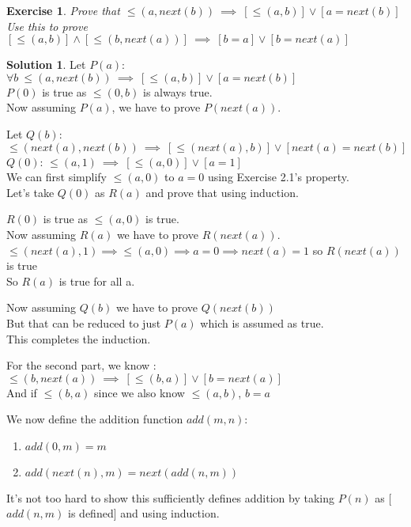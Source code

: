 \documentclass[a4paper,10pt]{article}
\newtheorem{exercise}{Exercise}[section]
\theoremstyle{definition} %
\newtheorem*{solution}{Solution}
\begin{document}
    \begin{exercise}
        Prove that $\leq(a, next(b)) \ \implies \ [\leq(a,b)] \lor [a=next(b)]$ \\
        Use this to prove $[\leq(a,b)] \land [\leq(b,next(a))] \ \implies \ [b=a] \lor [b=next(a)]$
    \end{exercise}
    \begin{solution}
        Let $P(a)$: $\forall b \ \leq(a, next(b)) \ \implies \ [\leq(a,b)] \lor [a=next(b)]$ \\
        $P(0)$ is true as $\leq(0,b)$ is always true. \\
        Now assuming $P(a)$, we have to prove $P(next(a))$.
        \begin{adjustwidth}{1cm}{0cm}
            Let $Q(b)$: $\leq(next(a), next(b)) \ \implies \ [\leq(next(a),b)] \lor [next(a)=next(b)]$ \\
            $Q(0)$: $\leq(a, 1) \ \implies \ [\leq(a,0)] \lor [a=1]$ \\
            We can first simplify $\leq(a,0)$ to $a=0$ using Exercise 2.1's property. \\
            Let's take $Q(0)$ as $R(a)$ and prove that using induction.
            \newpage
            \begin{adjustwidth}{1cm}{0cm}
                $R(0)$ is true as $\leq(a,0)$ is true. \\
                Now assuming $R(a)$ we have to prove $R(next(a))$. \\
                $\leq(next(a),1) \implies \leq(a,0) \implies a=0 \implies next(a)=1$ so $R(next(a))$ is true \\
                So $R(a)$ is true for all a.
            \end{adjustwidth}
            Now assuming $Q(b)$ we have to prove $Q(next(b))$ \\
            But that can be reduced to just $P(a)$ which is assumed as true. \\
            This completes the induction.
        \end{adjustwidth}
        
        For the second part, we know : \\
        $\leq(b, next(a)) \ \implies \ [\leq(b, a)] \lor [b = next(a)]$ \\
        And if $\leq(b, a)$ since we also know $\leq(a, b)$, $b = a$
    \end{solution}

    We now define the addition function $add(m, n)$: 
    \begin{tcolorbox}[colback=blue!10!white, colframe=blue!50!black]
        \begin{enumerate}
            \item $add(0, m) = m$
            \item $add(next(n), m) = next(add(n, m))$
        \end{enumerate}
    \end{tcolorbox}
    It's not too hard to show this sufficiently defines addition by taking $P(n)$ as
    [$add(n, m)$ is defined] and using induction.
\end{document}
